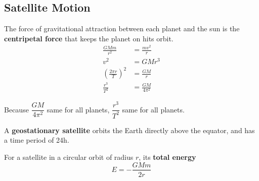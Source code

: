 \subsection{Satellite Motion}

The force of gravitational attraction between each planet and the sun is the \textbf{centripetal force} that keeps the planet on hits orbit.
\begin{align*}
    \frac{GMm}{r^2}&=\frac{mv^2}{r}\\
    v^2&=GMr^3\\
    \left(\frac{2\pi r}{T}\right)^2&=\frac{GM}{r}\\
    \frac{r^3}{T^2}&=\frac{GM}{4\pi^2}
\end{align*}

Because $\dfrac{GM}{4\pi^2}$ same for all planets, $\dfrac{r^3}{T^2}$ same for all planets.

A \textbf{geostationary satellite} orbits the Earth directly above the equator, and has a time period of 24h.

For a satellite in a circular orbit of radius $r$, its \textbf{total energy}
$$E=-\frac{GMm}{2r}$$
